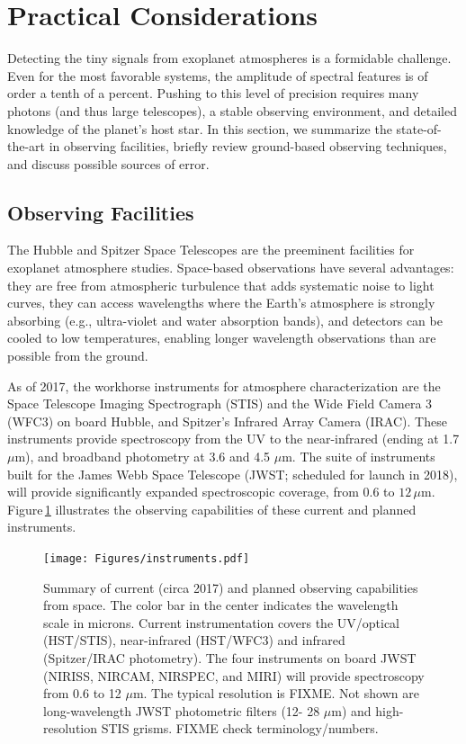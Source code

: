 \documentclass[graybox,natbib,nosecnum]{svmult}
\begin{document}
\section{Practical Considerations}
Detecting the tiny signals from exoplanet atmospheres is a formidable challenge. Even for the most favorable systems, the amplitude of spectral features is of order a tenth of a percent. Pushing to this level of precision requires many photons (and thus large telescopes), a stable observing environment, and detailed knowledge of the planet's host star.  In this section, we summarize the state-of-the-art in observing facilities, briefly review ground-based observing techniques, and discuss possible sources of error.

\subsection{Observing Facilities}
The Hubble and Spitzer Space Telescopes are the preeminent facilities for exoplanet atmosphere studies.  Space-based observations have several advantages: they are free from atmospheric turbulence that adds systematic noise to light curves, they can access wavelengths where the Earth's atmosphere is strongly absorbing (e.g., ultra-violet and water absorption bands), and detectors can be cooled to low temperatures, enabling longer wavelength observations than are possible from the ground.  

As of 2017, the workhorse instruments for atmosphere characterization are the Space Telescope Imaging Spectrograph (STIS) and the Wide Field Camera 3 (WFC3) on board Hubble, and Spitzer's Infrared Array Camera (IRAC).  These instruments provide spectroscopy from the UV to the near-infrared (ending at 1.7 $\mu$m), and broadband photometry at 3.6 and 4.5 $\mu$m. The suite of instruments built for the James Webb Space Telescope (JWST; scheduled for launch in 2018), will provide significantly expanded spectroscopic coverage, from $0.6$ to $12\,\mu$m.  Figure\,\ref{fig:instruments} illustrates the observing capabilities of these current and planned instruments. 

\begin{figure}
\begin{centering}
\texttt{[image: Figures/instruments.pdf]}
\caption{Summary of current (circa 2017) and planned observing capabilities from space. The color bar in the center indicates the wavelength scale in microns. Current instrumentation covers the UV/optical (HST/STIS), near-infrared (HST/WFC3) and infrared (Spitzer/IRAC photometry). The four instruments on board JWST (NIRISS, NIRCAM, NIRSPEC, and MIRI) will provide spectroscopy from 0.6 to 12 $\mu$m. The typical resolution is FIXME. Not shown are long-wavelength JWST photometric filters (12- 28 $\mu$m) and high-resolution STIS grisms. FIXME check terminology/numbers.}
\label{fig:instruments}       
\end{centering}
\end{figure}
\end{document}
